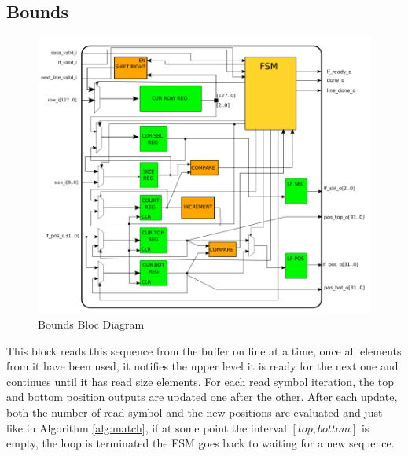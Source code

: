 \subsection{Bounds}


\begin{figure}[H]
    \centering
   \includegraphics[scale = 0.4]{Figures/BOUNDS_DIAG.png}
    \caption{Bounds Bloc Diagram}
    \label{fig:bounds_diag}
\end{figure}



 This block reads this sequence from the buffer on line at a time, once all elements from it have been used, it notifies the upper level it is ready for the next one and continues until it has read \textrm{size} elements. For each read symbol iteration, the top and bottom position outputs are updated one after the other. After each update, both the number of read symbol and the new positions are evaluated and just like in Algorithm \ref{alg:match}, if at some point the interval $ [ top,bottom ] $ is empty, the loop is terminated the FSM goes back to waiting for a new sequence.

